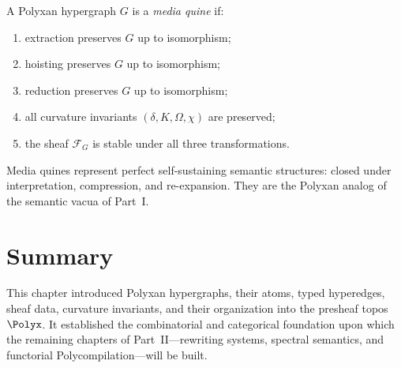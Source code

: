 \begin{definition}
A Polyxan hypergraph $G$ is a \emph{media quine} if:
\begin{enumerate}
  \item extraction preserves $G$ up to isomorphism;
  \item hoisting preserves $G$ up to isomorphism;
  \item reduction preserves $G$ up to isomorphism;
  \item all curvature invariants $(\delta, K, \Omega, \chi)$ are preserved;
  \item the sheaf $\mathscr{F}_G$ is stable under all three transformations.
\end{enumerate}
\end{definition}

Media quines represent perfect self-sustaining semantic structures:  
closed under interpretation, compression, and re-expansion.  
They are the Polyxan analog of the semantic vacua of Part~I.

\section{Summary}

This chapter introduced Polyxan hypergraphs, their atoms, typed hyperedges,
sheaf data, curvature invariants, and their organization into the presheaf
topos $\Polyx$.  
It established the combinatorial and categorical foundation upon which the
remaining chapters of Part~II---rewriting systems, spectral semantics, and
functorial Polycompilation---will be built.

